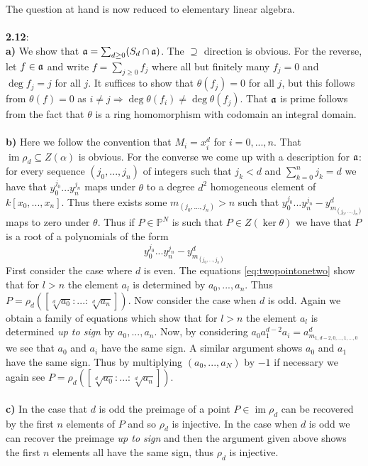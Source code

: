 \documentclass[12pt]{article}
\numberwithin{thm}{subsection}
\numberwithin{defn}{subsection}
\numberwithin{lemma}{subsection}
\numberwithin{example}{subsection}
\numberwithin{notation}{subsection}
\numberwithin{cor}{subsection}
\numberwithin{remark}{subsection}
\numberwithin{condition}{subsection}
\numberwithin{question}{subsection}
\numberwithin{construction}{subsection}
\numberwithin{construction}{subsection}
\numberwithin{construction}{subsection}
\newcommand{\bb}[1]{\mathbb{#1}}
\newcommand{\im}{\operatorname{im}}
\begin{document}
The question at hand is now reduced to elementary linear algebra.\\\\
%
\textbf{2.12}:\\
\textbf{a)} We show that $\frak{a} = \sum_{d \geq 0}(S_d \cap \frak{a})$. The $\supseteq$ direction is obvious. For the reverse, let $f \in \frak{a}$ and write $f = \sum_{j \geq 0}f_j$ where all but finitely many $f_j = 0$ and $\operatorname{deg}f_j = j$ for all $j$. It suffices to show that $\theta(f_j) = 0$ for all $j$, but this follows from $\theta(f) = 0$ as $i \neq j \Rightarrow \operatorname{deg}\theta(f_i) \neq \operatorname{deg}\theta(f_j)$. That $\frak{a}$ is prime follows from the fact that $\theta$ is a ring homomorphism with codomain an integral domain.\\\\
%
\textbf{b)} Here we follow the convention that $M_i = x_i^d$ for $i = 0,...,n$. That $\im \rho_d \subseteq Z(\alpha)$ is obvious. For the converse we come up with a description for $\frak{a}$: for every sequence $(j_0,...,j_n)$ of integers such that $j_k < d$ and $\sum_{k = 0}^n j_k = d$ we have that $y_0^{j_0}...y_n^{j_n}$ maps under $\theta$ to a degree $d^2$ homogeneous element of $k[x_0,...,x_n]$. Thus there exists some $m_{(j_0,...,j_n)} > n$ such that $y_0^{j_0}...y_n^{j_n} - y_{m_{(j_0,...,j_n)}}^d$ maps to zero under $\theta$. Thus if $P \in \bb{P}^N$ is such that $P \in Z(\ker \theta)$ we have that $P$ is a root of a polynomials of the form
\begin{equation}\label{eq:twopointonetwo}
    y_0^{j_0}...y_n^{j_n} - y_{m_{(j_0,...,j_n)}}^d
\end{equation}
First consider the case where $d$ is even. The equations \eqref{eq:twopointonetwo} show that for $l > n$ the element $a_l$ is determined by $a_0,...,a_n$. Thus $P = \rho_d([\sqrt[d]{a_0}:...:\sqrt[d]{a_n}])$. Now consider the case when $d$ is odd. Again we obtain a family of equations which show that for $l > n$ the element $a_l$ is determined \emph{up to sign} by $a_0,...,a_n$. Now, by considering $a_0a_1^{d-2}a_i = a_{m_{1,d-2,0,...,1,...,0}}^d$ we see that $a_0$ and $a_i$ have the same sign. A similar argument shows $a_0$ and $a_1$ have the same sign. Thus by multiplying $(a_0,...,a_N)$ by $-1$ if necessary we again see $P = \rho_d([\sqrt[d]{a_0}:...:\sqrt[d]{a_n}])$.\\\\
%
\textbf{c)} In the case that $d$ is odd the preimage of a point $P \in \im \rho_d$ can be recovered by the first $n$ elements of $P$ and so $\rho_d$ is injective. In the case when $d$ is odd we can recover the preimage \emph{up to sign} and then the argument given above shows the first $n$ elements all have the same sign, thus $\rho_d$ is injective.\\\\
\end{document}
